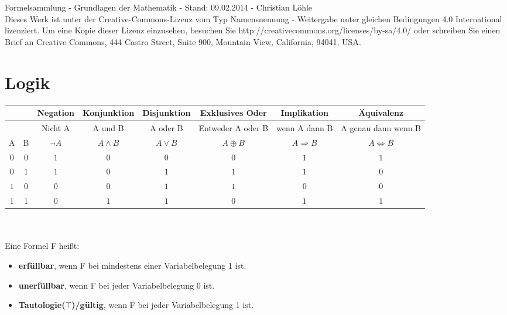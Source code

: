 \documentclass[11pt]{article}
\begin{document}
Formelsammlung - Grundlagen der Mathematik - Stand: 09.02.2014 - Christian L{\"o}hle\\
\footnotesize Dieses Werk ist unter der Creative-Commons-Lizenz vom Typ Namensnennung - Weitergabe unter gleichen Bedingungen 4.0 International lizenziert. Um eine Kopie dieser Lizenz einzusehen, besuchen Sie http://creativecommons.org/licenses/by-sa/4.0/ oder schreiben Sie einen Brief an Creative Commons, 444 Castro Street, Suite 900, Mountain View, California, 94041, USA.\normalsize

\section{Logik}
\begin{tabular}{|c|c|c|c|c|c|c|c|} \hline
&& Negation & Konjunktion & Disjunktion & Exklusives Oder & Implikation & {\"A}quivalenz\\ \hline
&& Nicht A & A und B & A oder B & Entweder A oder B & wenn A dann B & A genau dann wenn B\\ \hline
A & B & $\neg A$  &  $A \land B$ & $A \lor B$ &  $A \oplus B$ & $A \Rightarrow B$ & $A \Leftrightarrow B$ \\ \hline
$0$ & $0$ & $1$ & $0$ & $0$ & $0$ & $1$ & $1$ \\ \hline
$0$ & $1$ & $1$ & $0$ & $1$ & $1$ & $1$ & $0$ \\ \hline
$1$ & $0$ & $0$ & $0$ & $1$ & $1$ & $0$ & $0$ \\ \hline
$1$ & $1$ & $0$ & $1$ & $1$ & $0$ & $1$ & $1$ \\ \hline
\end{tabular}\\ \\
Eine Formel F hei{\ss}t:
\begin{itemize}\itemsep0em\small
\item {\bfseries erf{\"u}llbar}, wenn F bei mindestens einer Variabelbelegung 1 ist.\\
\item {\bfseries unerf{\"u}llbar}, wenn F bei jeder Variabelbelegung 0 ist.\\
\item {\bfseries Tautologie($\top$)/g{\"u}ltig}, wenn F bei jeder Variabelbelegung 1 ist.
\end{itemize}\normalsize
\end{document}
